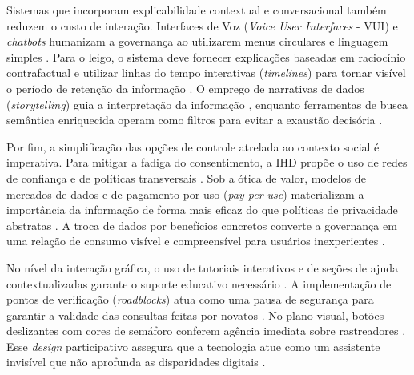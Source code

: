 \documentclass[
	12pt,				%
	oneside,			%
	a4paper,			%
	english,			%
	brazil				%
	]{abntex2ppgsi}
\begin{document}
    Sistemas que incorporam explicabilidade contextual e conversacional também reduzem o custo de interação. Interfaces de Voz (\textit{Voice User Interfaces} - VUI) e \textit{chatbots} humanizam a governança ao utilizarem menus circulares e linguagem simples \cite{Sailaja2024334, Jordan2023, Sailaja2021, Jones2017}. Para o leigo, o sistema deve fornecer explicações baseadas em raciocínio contrafactual e utilizar linhas do tempo interativas (\textit{timelines}) para tornar visível o período de retenção da informação \cite{DOWTHWAITE2024, DeAlmeida2019, Coleti2019DesigPatterns}. O emprego de narrativas de dados (\textit{storytelling}) guia a interpretação da informação \cite{Capeleti2024Human}, enquanto ferramentas de busca semântica enriquecida operam como filtros para evitar a exaustão decisória \cite{Konomi2022, VICTORELLI2020Understanding}.

    Por fim, a simplificação das opções de controle atrelada ao contexto social é imperativa. Para mitigar a fadiga do consentimento, a IHD propõe o uso de redes de confiança e de políticas transversais \cite{Lockwood2020AnAccessible, Hutton2017}. Sob a ótica de valor, modelos de mercados de dados e de pagamento por uso (\textit{pay-per-use}) materializam a importância da informação de forma mais eficaz do que políticas de privacidade abstratas \cite{Briggs2021, Chowdhury2016, Mashhadi2014}. A troca de dados por benefícios concretos converte a governança em uma relação de consumo visível e compreensível para usuários inexperientes \cite{Mashhadi2014}.

    No nível da interação gráfica, o uso de tutoriais interativos e de seções de ajuda contextualizadas garante o suporte educativo necessário \cite{Capeleti2024Human}. A implementação de pontos de verificação (\textit{roadblocks}) atua como uma pausa de segurança para garantir a validade das consultas feitas por novatos \cite{Briggs2021, Chowdhury2016}. No plano visual, botões deslizantes com cores de semáforo conferem agência imediata sobre rastreadores \cite{Barreto2018}. Esse \textit{design} participativo assegura que a tecnologia atue como um assistente invisível que não aprofunda as disparidades digitais \cite{calvetti2024human, hayes2024making, Refat2023}.

    
\end{document}
